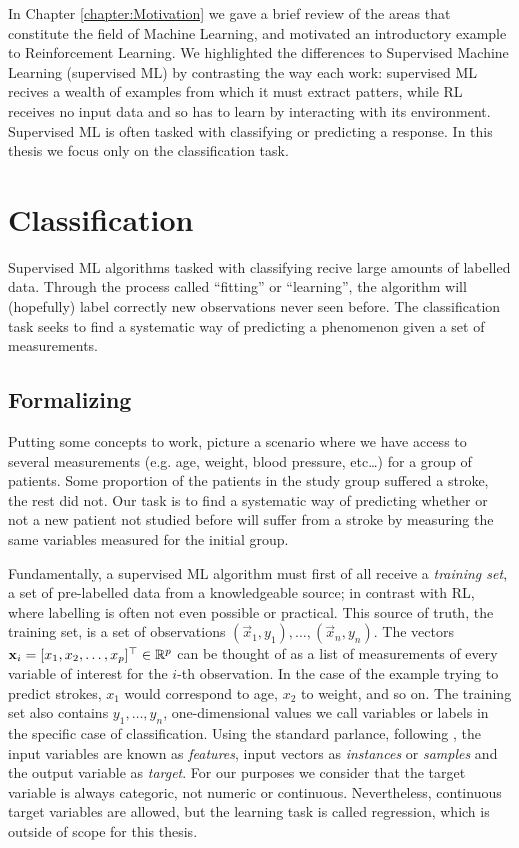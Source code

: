 In Chapter \ref{chapter:Motivation} we gave a brief review of the areas that
constitute the field of Machine Learning, and motivated an introductory example
to Reinforcement Learning. We highlighted the differences to Supervised Machine
Learning (supervised ML) by contrasting the way each work: supervised ML recives
a wealth of examples from which it must extract patters, while RL receives no
input data and so has to learn by interacting with its environment. Supervised
ML is often tasked with classifying or predicting a response. In this thesis we
focus only on the classification task.

\section{Classification}
Supervised ML algorithms tasked with classifying recive large amounts of
labelled data. Through the process called ``fitting'' or ``learning'', the
algorithm will (hopefully) label correctly new observations never seen before.
The classification task seeks to find a systematic way of predicting a
phenomenon given a set of measurements.

\subsection{Formalizing}
Putting some concepts to work, picture a scenario where we have access to
several measurements (e.g. age, weight, blood pressure, etc\dots) for a group of
patients. Some proportion of the patients in the study group suffered a stroke,
the rest did not. Our task is to find a systematic way of predicting whether or
not a new patient not studied before will suffer from a stroke by measuring the
same variables measured for the initial group.

Fundamentally, a supervised ML algorithm must first of all receive a
\textit{training set}, a set of pre-labelled data from a knowledgeable source; in
contrast with RL, where labelling is often not even possible or practical. This
source of truth, the training set, is a set of observations $(\vec{x}_1, y_1),
\dots, (\vec{x}_n, y_n)$. The vectors $\mathbf{x}_i = [x_1, x_2, \dots, x_p]^{\top}
\in \mathbb{R}^{p}$ can be thought of as a list of measurements of every variable of
interest for the $i$-th observation. In the case of the example trying to
predict strokes, $x_1$ would correspond to age, $x_2$ to weight, and so on. The
training set also contains $y_1, \dots, y_n$, one-dimensional values we call
variables or labels in the specific case of classification. Using the standard
parlance, following \cite{louppe2014}, the input variables are known as
\textit{features}, input vectors as \textit{instances} or \textit{samples} and
the output variable as \textit{target}. For our purposes we consider that the
target variable is always categoric, not numeric or continuous. Nevertheless,
continuous target variables are allowed, but the learning task is called
regression, which is outside of scope for this thesis.

